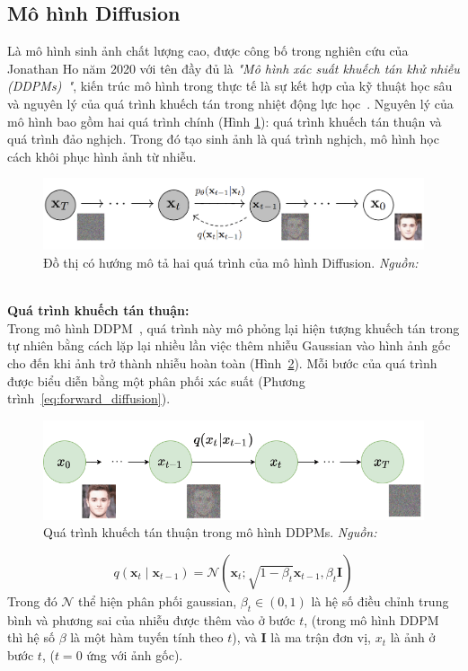 \subsection{Mô hình Diffusion}
%
Là mô hình sinh ảnh chất lượng cao, được công bố trong nghiên cứu của Jonathan Ho năm 2020 với tên đầy đủ là \textit{"Mô hình xác suất khuếch tán khử nhiễu (DDPMs)~\cite{Ho2020DenoisingDP}"}, kiến trúc mô hình trong thực tế là sự kết hợp của kỹ thuật học sâu và nguyên lý của quá trình khuếch tán trong nhiệt động lực học~\cite{pmlr-v37-sohl-dickstein15}. Nguyên lý của mô hình bao gồm hai quá trình chính (Hình \ref{fig:model-diffusion-1}): quá trình khuếch tán thuận và quá trình đảo nghịch. Trong đó tạo sinh ảnh là quá trình nghịch, mô hình học cách khôi phục hình ảnh từ nhiễu.
%
\begin{figure}[h]
	\centering
	\includegraphics[width=1.0\linewidth]{Images/model-diffusion-1.png}
	\caption{
		Đồ thị có hướng mô tả hai quá trình của mô hình Diffusion. \textit{Nguồn: \cite{Ho2020DenoisingDP}}
	}
	\label{fig:model-diffusion-1}
\end{figure}\\
%
\textbf{Quá trình khuếch tán thuận:}\\
%
Trong mô hình DDPM~\cite{Ho2020DenoisingDP}, quá trình này mô phỏng lại hiện tượng khuếch tán trong tự nhiên bằng cách lặp lại nhiều lần việc thêm nhiễu Gaussian vào hình ảnh gốc cho đến khi ảnh trở thành nhiễu hoàn toàn (Hình~\ref{fig:model-forward-diffusion}).
%
Mỗi bước của quá trình được biểu diễn bằng một phân phối xác suất (Phương trình~\ref{eq:forward_diffusion}).
%
\begin{figure}[h]
	\centering
	\includegraphics[width=0.8\linewidth]{Images/model-forward-diffusion.png}
	\caption{
		Quá trình khuếch tán thuận trong mô hình DDPMs. \textit{Nguồn: \cite{Ho2020DenoisingDP}}
	}
	\label{fig:model-forward-diffusion}
\end{figure}
%
\begin{equation}
	q(\mathbf{x}_t \mid \mathbf{x}_{t-1}) = \mathcal{N}(\mathbf{x}_t; \sqrt{1-\beta_t} \mathbf{x}_{t-1}, \beta_t \mathbf{I})
	\label{eq:forward_diffusion}
\end{equation}
%
Trong đó \(\mathcal{N}\) thể hiện phân phối \Gls{gaussian}, \(\beta_t \in (0,1) \) là hệ số điều chỉnh trung bình và phương sai của nhiễu được thêm vào ở bước \(t\), (trong mô hình DDPM~\cite{Ho2020DenoisingDP} thì hệ số $\beta$ là một hàm tuyến tính theo $t$), và \(\mathbf{I}\) là ma trận đơn vị, \(x_t\) là ảnh ở bước \(t\), (\(t=0\) ứng với ảnh gốc).

